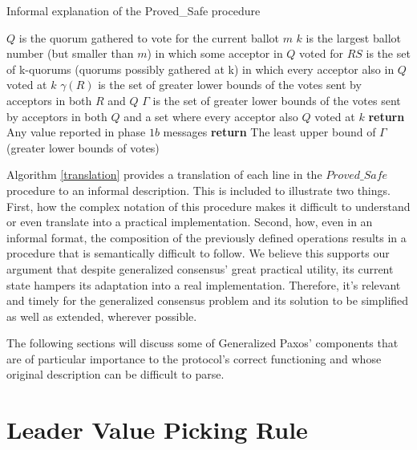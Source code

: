 \begin{algorithm}
	\caption{Informal explanation of the Proved\_Safe procedure}
	\label{translation}
	\begin{algorithmic}[1]
		\State $Q$ is the quorum gathered to vote for the current ballot $m$
		\State $k$ is the largest ballot number (but smaller than $m$) in which some acceptor in $Q$ voted for 
		\State $RS$ is the set of k-quorums (quorums possibly gathered at k) in which every acceptor also in $Q$ voted at $k$
		\State $\gamma(R)$ is the set of greater lower bounds of the votes sent by acceptors in both $R$ and $Q$
		\State $\Gamma$ is the set of greater lower bounds of the votes sent by acceptors in both $Q$ and a set where every acceptor also $Q$ voted at $k$
		\State \textbf{return} Any value reported in phase $1b$ messages
		\Else
		\State \textbf{return} The least upper bound of $\Gamma$ (greater lower bounds of votes)
		\EndIf
		\EndFunction
		
	\end{algorithmic}
\end{algorithm}

Algorithm \ref{translation} provides a translation of each line in the $Proved\_Safe$ procedure to an informal description. This is included to illustrate two things. First, how the complex notation of this procedure makes it difficult to understand or even translate into a practical implementation. Second, how, even in an informal format, the composition of the previously defined operations results in a procedure that is semantically difficult to follow. We believe this supports our argument that despite generalized consensus' great practical utility, its current state hampers its adaptation into a real implementation. Therefore, it's relevant and timely for the generalized consensus problem and its solution to be simplified as well as extended, wherever possible.\par
The following sections will discuss some of Generalized Paxos' components that are of particular importance to the protocol's correct functioning and whose original description can be difficult to parse.

\section{Leader Value Picking Rule} \label{value_picking}

